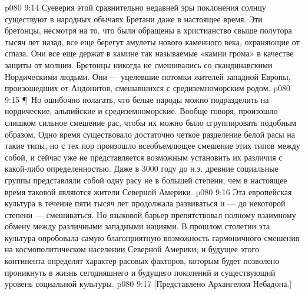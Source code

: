 \vs p080 9:14 Суеверия этой сравнительно недавней эры поклонения солнцу существуют в народных обычаях Бретани даже в настоящее время. Эти бретонцы, несмотря на то, что были обращены в христианство свыше полутора тысяч лет назад, все еще берегут амулеты нового каменного века, охраняющие от сглаза. Они все еще держат в камине так называемые «камни грома» в качестве защиты от молнии. Бретонцы никогда не смешивались со скандинавскими Нордическими людьми. Они --- уцелевшие потомки жителей западной Европы, произошедших от Андонитов, смешавшихся с средиземноморским родом.
\vs p080 9:15 \P\ Но ошибочно полагать, что белые народы можно подразделить на нордические, альпийские и средиземноморские. Вообще говоря, произошло слишком сильное смешение рас, чтобы их можно было сгруппировать подобным образом. Одно время существовало достаточно четкое разделение белой расы на такие типы, но с тех пор произошло всеобъемлющее смешение этих типов между собой, и сейчас уже не представляется возможным установить их различия с какой\hyp{}либо определенностью. Даже в 3000 году до н.э. древние социальные группы представляли собой одну расу не в большей степени, чем в настоящее время таковой являются жители Северной Америки.
\vs p080 9:16 Эта европейская культура в течение пяти тысяч лет продолжала развиваться и --- до некоторой степени --- смешиваться. Но языковой барьер препятствовал полному взаимному обмену между различными западными нациями. В прошлом столетии эта культура опробовала самую благоприятную возможность гармоничного смешения на космополитическом населении Северной Америки; и будущее этого континента определят характер расовых факторов, которым будет позволено проникнуть в жизнь сегодняшнего и будущего поколений и существующий уровень социальной культуры.
\vs p080 9:17 [Представлено Архангелом Небадона.]
